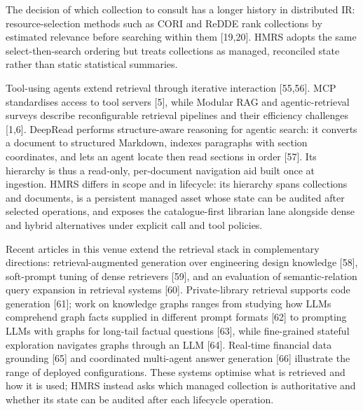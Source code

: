 \documentclass[11pt]{article}
\begin{document}
The decision of which collection to consult has a longer history in
distributed IR: resource-selection methods such as CORI and ReDDE rank
collections by estimated relevance before searching within them
[19,20]. HMRS adopts the same
select-then-search ordering but treats collections as managed, reconciled
state rather than static statistical summaries.

Tool-using agents extend retrieval through iterative interaction
[55,56]. MCP standardises access to tool servers
[5], while Modular RAG and agentic-retrieval surveys describe
reconfigurable retrieval pipelines and their efficiency challenges
[1,6]. DeepRead performs structure-aware
reasoning for agentic search: it converts a document to structured Markdown,
indexes paragraphs with section coordinates, and lets an agent locate then
read sections in order [57]. Its hierarchy is thus a read-only,
per-document navigation aid built once at ingestion. HMRS differs in scope
and in lifecycle: its hierarchy spans collections and documents, is a
persistent managed asset whose state can be audited after selected operations, and exposes the
catalogue-first librarian lane alongside dense and hybrid alternatives under
explicit call and tool policies.

Recent articles in this venue extend the retrieval stack in complementary
directions: retrieval-augmented generation over engineering design knowledge
[58], soft-prompt tuning of dense retrievers
[59], and an evaluation of semantic-relation query expansion
in retrieval systems [60]. Private-library retrieval
supports code generation [61]; work on knowledge graphs
ranges from studying how LLMs comprehend graph facts supplied in different
prompt formats [62] to prompting LLMs with graphs for
long-tail factual questions [63], while fine-grained
stateful exploration navigates graphs through an LLM [64].
Real-time financial data grounding [65] and coordinated
multi-agent answer generation [66] illustrate the
range of deployed configurations. These systems optimise what is retrieved
and how it is used; HMRS instead asks which managed collection is
authoritative and whether its state can be audited after each lifecycle
operation.
\end{document}
